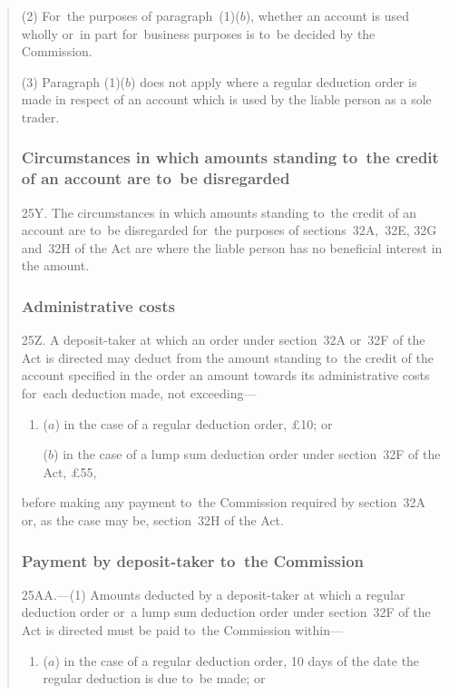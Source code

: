 \documentclass[12pt,a4paper]{article}
\begin{document}
\begin{quotation}
(2) For~the purposes of paragraph~(1)($b$), whether an account is used wholly or~in part for~business purposes is to~be decided by the Commission.

(3) Paragraph (1)($b$)  does not apply where a regular deduction order is made in respect of an account which is used by the liable person as a sole trader.

\subsubsection*{Circumstances in which amounts standing to~the credit of an account are to~be disregarded}

25Y.  The circumstances in which amounts standing to~the credit of an account are to~be disregarded for~the purposes of sections~32A,~32E, 32G and~32H of the Act are where the liable person has no beneficial interest in the amount.

\subsubsection*{Administrative costs}

25Z.  A deposit-taker at which an order under section~32A or~32F of the Act is directed may deduct from the amount standing to~the credit of the account specified in the order an amount towards its administrative costs for~each deduction made, not exceeding—
\begin{enumerate}\item[]
($a$) in the case of a regular deduction order, £10; or

($b$) in the case of a lump sum deduction order under section~32F of the Act, £55,
\end{enumerate}
before making any payment to~the Commission required by section~32A or, as the case may be, section~32H of the Act.

\subsubsection*{Payment by deposit-taker to~the Commission}

25AA.---(1)  Amounts deducted by a deposit-taker at which a regular deduction order or~a lump sum deduction order under section~32F of the Act is directed must be paid to~the Commission within—
\begin{enumerate}\item[]
($a$) in the case of a regular deduction order, 10 days of the date the regular deduction is due to~be made; or


\end{enumerate}
\end{quotation}
\end{document}
